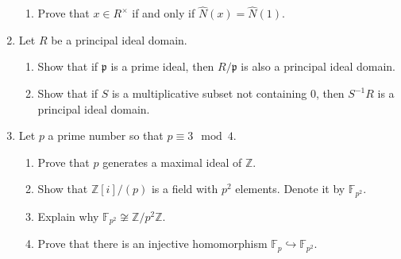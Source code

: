 \documentclass[11pt]{article}
\newcommand{\bF}{\mathbb{F}}
\newcommand{\bZ}{\mathbb{Z}}
\newcommand{\fp}{\mathfrak{p}}
\begin{document}
\begin{enumerate}
{\begin{enumerate}
{    Let $\hat N:R\to\bZ$ be given by the following rule.
    \[\hat N(r) = \min_{x\in R\setminus\{0\}} N(xr).\]
    Prove that $\hat N$ is a Euclidean norm on $R$, and also that it satisfies the further condition that if $a|b$ then $\hat N(a)\le\hat N(b)$.
    }
    \item{
    Prove that $x\in R^\times$ if and only if $\hat N(x)=\hat N(1)$.
    }
  \end{enumerate}
  }
  \item{
  Let $R$ be a principal ideal domain.
  \begin{enumerate}
    \item{
    Show that if $\fp$ is a prime ideal, then $R/\fp$ is also a principal ideal domain.
    }
    \item{
    Show that if $S$ is a multiplicative subset not containing $0$, then $S^{-1}R$ is a principal ideal domain.
    }
  \end{enumerate}
  }
  \item{
  Let $p$ a prime number so that $p\equiv3\mod 4$.
  \begin{enumerate}
    \item{
    Prove that $p$ generates a maximal ideal of $\bZ$.
    }
    \item{
    Show that $\bZ[i]/(p)$ is a field with $p^2$ elements.  Denote it by $\bF_{p^2}$.
    }
    \item{
    Explain why $\bF_{p^2}\not\cong\bZ/p^2\bZ$.
    }
    \item{
    Prove that there is an injective homomorphism $\bF_p\hookrightarrow\bF_{p^2}$.
    }
  \end{enumerate}
  }
\end{enumerate}
\end{document}
